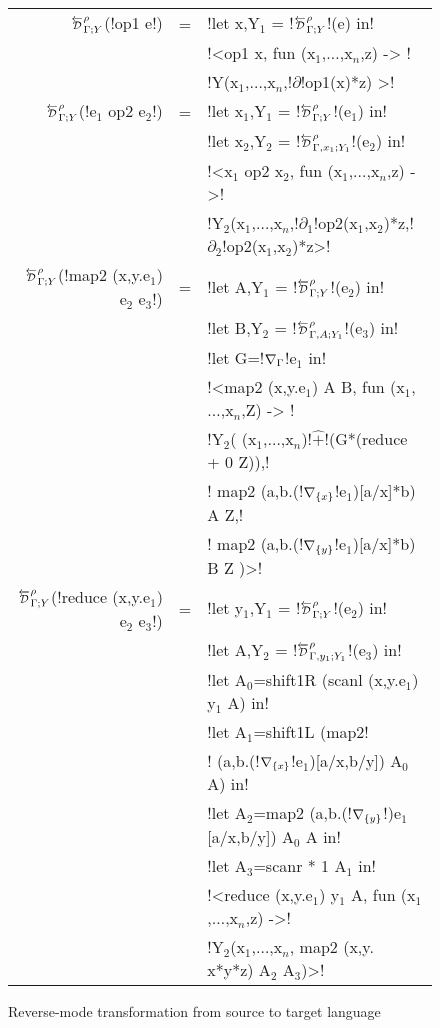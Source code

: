 \begin{figure*}[t]
\begin{tabular}{|r c l|}
        $\directD{\rho}{\Gamma}{Y}$(!op1 e!) &=&  
            !let x,Y$_{1}$ = !$\directD{\rho}{\Gamma}{Y}$!(e) in! \\
            && !<op1 x, fun (x$_{1}$,$\ldots$,x$_n$,z) -> ! \\
            && !Y(x$_{1}$,$\ldots$,x$_n$,!$\partial$!op1(x)*z) >! \\
        $\directD{\rho}{\Gamma}{Y}$(!e$_{1}$ op2 e$_{2}$!) &=& 
            !let x$_{1}$,Y$_{1}$ = !$\directD{\rho}{\Gamma}{Y}$!(e$_{1}$) in! \\
            && !let x$_{2}$,Y$_{2}$ = !$\directD{\rho}{\Gamma,x_1}{Y_1}$!(e$_{2}$) in! \\
            && !<x$_{1}$ op2 x$_{2}$, fun (x$_{1}$,$\ldots$,x$_n$,z) ->! \\
            && !Y$_{2}$(x$_{1}$,$\ldots$,x$_n$,!$\partial_1$!op2(x$_{1}$,x$_{2}$)*z,!$\partial_2$!op2(x$_{1}$,x$_{2}$)*z>! \\
        $\directD{\rho}{\Gamma}{Y}$(!map2 (x,y.e$_{1}$) e$_{2}$ e$_{3}$!) &=&  
            !let A,Y$_{1}$ = !$\directD{\rho}{\Gamma}{Y}$!(e$_{2}$) in! \\
            && !let B,Y$_{2}$ = !$\directD{\rho}{\Gamma,A}{Y_1}$!(e$_{3}$) in! \\
            && !let G=!$\nabla_{\Gamma}$!e$_{1}$ in!\\
            && !<map2 (x,y.e$_{1}$) A B, fun (x$_{1}$,$\ldots$,x$_n$,Z) -> !\\
            && !Y$_{2}$( (x$_{1}$,$\ldots$,x$_n$)!$\widehat{+}$!(G*(reduce + 0 Z)),!\\
            && \quad\quad! map2 (a,b.(!$\nabla_{\{x\}}$!e$_{1}$)[a/x]*b) A Z,!\\
            && \quad\quad! map2 (a,b.(!$\nabla_{\{y\}}$!e$_{1}$)[a/x]*b) B Z )>!\\
        $\directD{\rho}{\Gamma}{Y}$(!reduce (x,y.e$_{1}$) e$_{2}$ e$_{3}$!) &=&
            !let y$_{1}$,Y$_{1}$ = !$\directD{\rho}{\Gamma}{Y}$!(e$_{2}$) in! \\
            && !let A,Y$_{2}$ = !$\directD{\rho}{\Gamma,y_1}{Y_1}$!(e$_{3}$) in! \\
            && !let A$_{0}$=shift1R (scanl (x,y.e$_{1}$) y$_{1}$ A) in! \\
            && !let A$_{1}$=shift1L (map2! \\
            && !   (a,b.(!$\nabla_{\{x\}}$!e$_{1}$)[a/x,b/y]) A$_{0}$ A) in! \\
            && !let A$_{2}$=map2 (a,b.(!$\nabla_{\{y\}}$!)e$_{1}$[a/x,b/y]) A$_{0}$ A in! \\
            && !let A$_{3}$=scanr * 1 A$_{1}$ in! \\
            && !<reduce (x,y.e$_{1}$) y$_{1}$ A, fun (x$_{1}$,$\ldots$,x$_n$,z) ->! \\
            && !Y$_{2}$(x$_{1}$,$\ldots$,x$_n$, map2 (x,y. x*y*z) A$_{2}$ A$_{3}$)>! \\ \hline
        \end{tabular}
    \vspace{-0.4cm}
    \caption{Reverse-mode transformation from source to target language}
    \label{fig:direct_diff_macro}    
    \vspace{-0.4cm}
\end{figure*}